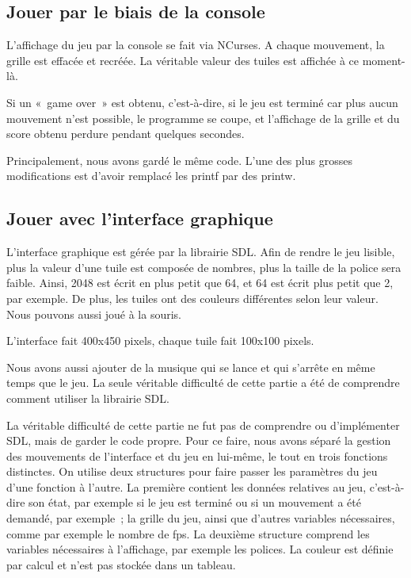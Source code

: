 \documentclass[12pt]{report}
\begin{document}
\subsection{Jouer par le biais de la console} 
L’affichage du jeu par la console se fait via NCurses. A chaque mouvement, la grille est effacée et recréée. La véritable valeur des tuiles est affichée à ce moment-là.

Si un « game over » est obtenu, c’est-à-dire, si le jeu est terminé car plus aucun mouvement n’est possible, le programme se coupe, et l’affichage de la grille et du score obtenu perdure pendant quelques secondes.

Principalement, nous avons gardé le même code. L’une des plus grosses modifications est d’avoir remplacé les printf par des printw.

\subsection{Jouer avec l’interface graphique}
L’interface graphique est gérée par la librairie SDL. Afin de rendre le jeu lisible, plus la valeur d’une tuile est composée de nombres, plus la taille de la police sera faible. Ainsi, 2048 est écrit en plus petit que 64, et 64 est écrit plus petit que 2, par exemple. De plus, les tuiles ont des couleurs différentes selon leur valeur. Nous pouvons aussi joué à la souris.

L’interface fait 400x450 pixels, chaque tuile fait 100x100 pixels.

Nous avons aussi ajouter de la musique qui se lance et qui s’arrête en même temps que le jeu.
La seule véritable difficulté de cette partie a été de comprendre comment utiliser la librairie SDL. 

La véritable difficulté de cette partie ne fut pas de comprendre ou d’implémenter SDL, mais de garder le code propre. Pour ce faire, nous avons séparé la gestion des mouvements de l’interface et du  jeu en lui-même, le tout en trois fonctions distinctes.
On utilise deux structures pour faire passer les paramètres du jeu d’une fonction à l’autre. La première contient les données relatives au jeu, c’est-à-dire son état, par exemple si le jeu est terminé ou si un mouvement a été demandé, par exemple ; la grille du jeu, ainsi que d’autres variables nécessaires, comme par exemple le nombre de fps.
La deuxième structure comprend les variables nécessaires à l’affichage, par exemple les polices.
La couleur est définie par calcul et n’est pas stockée dans un tableau.
\end{document}
